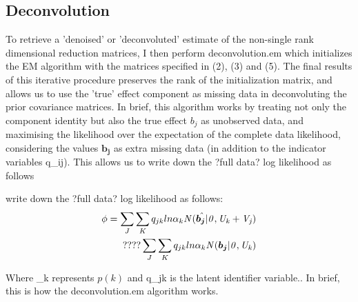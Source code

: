 \documentclass[10pt,letterpaper]{article}
\begin{document}
\subsection{Deconvolution}
To retrieve a 'denoised' or 'deconvoluted' estimate of the non-single rank dimensional reduction matrices, I then perform deconvolution.em which initializes the EM algorithm with  the matrices specified in (2), (3) and (5). The final results of this iterative procedure preserves the rank of the initialization matrix, and allows us to use the 'true' effect component as missing data in deconvoluting the prior covariance matrices. In brief, this algorithm works by treating not only the component identity but also the true effect $b_{j}$ as unobserved data, and maximising the likelihood over the expectation of the complete data likelihood, considering the values $\bm{{b}_{j}}$ as extra missing data (in addition to the indicator variables q_{ij}). This allows us to write down the ?full data? log likelihood as follows

write down the ?full data? log likelihood as follows:
\begin{equation}
\begin{split}
\phi=\sum_{J} \sum_{K} q_{jk} ln \alpha_{k} \it{N}(\bm{\hat{{b}_{j}}}|0,U_{k}+V_{j})\\
????\sum_{J} \sum_{K} q_{jk} ln \alpha_{k} \it{N}(\bm{{b}_{j}}|0,U_{k})
\end{split}
\end{equation}

Where \alpha_{k} represents $p(k)$ and q_{jk} is the latent identifier variable..
In brief, this is how the deconvolution.em algorithm works.

%
%
%
\end{document}
